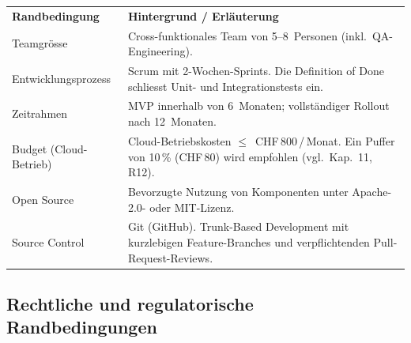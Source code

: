 \begin{tabularx}{\textwidth}{L{3.2cm} X}
  \color{white}\textbf{Randbedingung} &
  \color{white}\textbf{Hintergrund / Erläuterung} \\

  Teamgrösse &
  Cross-funktionales Team von 5--8~Personen
  (inkl.\ QA-Engineering). \\

  Entwicklungsprozess &
  Scrum mit 2-Wochen-Sprints. Die Definition of Done
  schliesst Unit- und Integrationstests ein. \\

  Zeitrahmen &
  MVP innerhalb von 6~Monaten; vollständiger Rollout
  nach 12~Monaten. \\

  Budget (Cloud-Betrieb) &
  Cloud-Betriebskosten $\leq$~CHF\,800\,/\,Monat.
  Ein Puffer von 10\,\% (CHF\,80) wird empfohlen
  (vgl.\ Kap.~11, R12). \\

  Open Source &
  Bevorzugte Nutzung von Komponenten unter Apache-2.0-
  oder MIT-Lizenz. \\

  Source Control &
  Git (GitHub). Trunk-Based Development\footnotemark{} mit
  kurzlebigen Feature-Branches und verpflichtenden
  Pull-Request-Reviews. \\
\end{tabularx}



\subsection{Rechtliche und regulatorische Randbedingungen}
\label{sec:randbedingungen-recht}

